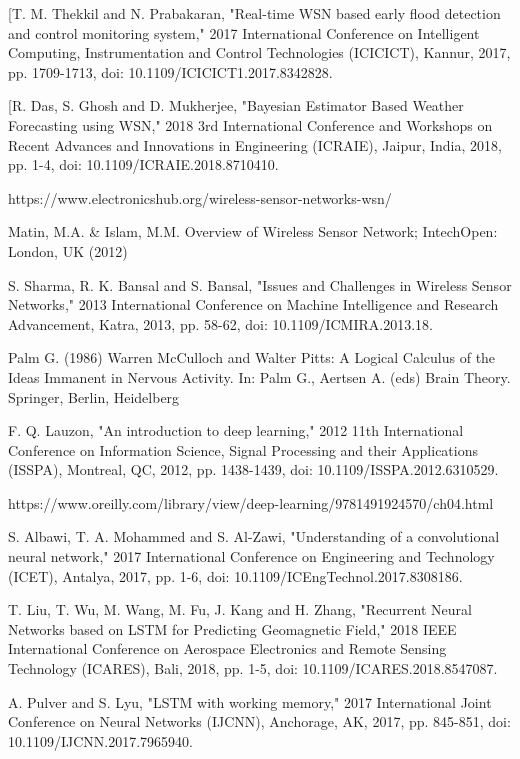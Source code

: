 \documentclass[12pt]{report}
\begin{document}
\begin{thebibliography}{}
[T. M. Thekkil and N. Prabakaran, "Real-time WSN based early flood detection and control monitoring system," 2017 International Conference on Intelligent Computing, Instrumentation and Control Technologies (ICICICT), Kannur, 2017, pp. 1709-1713, doi: 10.1109/ICICICT1.2017.8342828.

[R. Das, S. Ghosh and D. Mukherjee, "Bayesian Estimator Based Weather Forecasting using WSN," 2018 3rd International Conference and Workshops on Recent Advances and Innovations in Engineering (ICRAIE), Jaipur, India, 2018, pp. 1-4, doi: 10.1109/ICRAIE.2018.8710410.

 https://www.electronicshub.org/wireless-sensor-networks-wsn/

 Matin, M.A. \& Islam, M.M. Overview of Wireless Sensor Network; IntechOpen: London, UK (2012)

 S. Sharma, R. K. Bansal and S. Bansal, "Issues and Challenges in Wireless Sensor Networks," 2013 International Conference on Machine Intelligence and Research Advancement, Katra, 2013, pp. 58-62, doi: 10.1109/ICMIRA.2013.18.

 Palm G. (1986) Warren McCulloch and Walter Pitts: A Logical Calculus of the Ideas Immanent in Nervous Activity. In: Palm G., Aertsen A. (eds) Brain Theory. Springer, Berlin, Heidelberg

 F. Q. Lauzon, "An introduction to deep learning," 2012 11th International Conference on Information Science, Signal Processing and their Applications (ISSPA), Montreal, QC, 2012, pp. 1438-1439, doi: 10.1109/ISSPA.2012.6310529.

 https://www.oreilly.com/library/view/deep-learning/9781491924570/ch04.html

 S. Albawi, T. A. Mohammed and S. Al-Zawi, "Understanding of a convolutional neural network," 2017 International Conference on Engineering and Technology (ICET), Antalya, 2017, pp. 1-6, doi: 10.1109/ICEngTechnol.2017.8308186.

 T. Liu, T. Wu, M. Wang, M. Fu, J. Kang and H. Zhang, "Recurrent Neural Networks based on LSTM for Predicting Geomagnetic Field," 2018 IEEE International Conference on Aerospace Electronics and Remote Sensing Technology (ICARES), Bali, 2018, pp. 1-5, doi: 10.1109/ICARES.2018.8547087.

 A. Pulver and S. Lyu, "LSTM with working memory," 2017 International Joint Conference on Neural Networks (IJCNN), Anchorage, AK, 2017, pp. 845-851, doi: 10.1109/IJCNN.2017.7965940.


\end{thebibliography}
\end{document}
